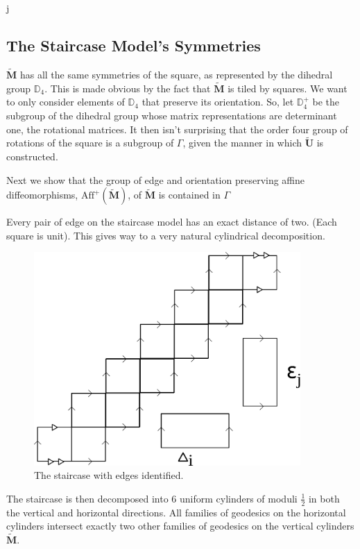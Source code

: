 j\documentclass[]{article}
\begin{document}
\subsection{The Staircase Model's Symmetries}
$\tilde{\mathbf{M}}$ has all the same symmetries of the square, as represented by the dihedral group $\mathbb{D}_4$. This is made obvious by the fact that $\tilde{\mathbf{M}}$ is tiled by squares. We want to only consider elements of $\mathbb{D}_4$ that preserve its orientation. So, let $\mathbb{D}^{+}_4$ be the subgroup of the dihedral group whose matrix representations are determinant one, the rotational matrices. It then isn't surprising that the order four group of rotations of the square is a subgroup of $\Gamma$, given the manner in which $\tilde{\mathbf{U}}$ is constructed. 

Next we show that the group of edge and orientation preserving  affine diffeomorphisms, $\text{Aff}^{+}(\tilde{\mathbf{M}})$, of $\tilde{\mathbf{M}}$ is contained in $\Gamma$

Every pair of edge on the staircase model has an exact distance of two. (Each square is unit). This gives way to a very natural cylindrical decomposition.

\begin{figure}[H]
\centering
\includegraphics[width=4in]{cylinderdecomp.pdf}
\caption{The staircase with edges identified.}
\label{fig:decomp}
\end{figure}

The staircase is then decomposed into 6 uniform cylinders of moduli $\frac{1}{2}$ in both the vertical and horizontal directions. All families of geodesics on the horizontal cylinders intersect exactly two other families of geodesics on the vertical cylinders $\tilde{\mathbf{M}}$.
\end{document}
